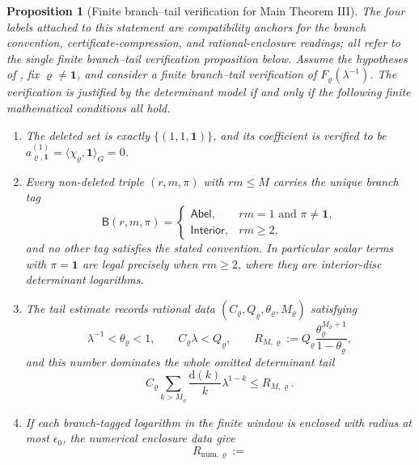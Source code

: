 \documentclass[11pt,a4paper]{amsart}
\theoremstyle{plain}
\newtheorem{proposition}[theorem]{Proposition}
\theoremstyle{definition}
\theoremstyle{remark}
\begin{document}
\begin{proposition}[Finite branch--tail verification for Main Theorem III]
  \label{prop:fixed-label-branch-tail-record}
  \label{cor:main-iii-boundary-determinant-convention}
  \label{thm:fixed-label-certificate-compression}
  \label{cor:fixed-label-product-rational-enclosures}
  The four labels attached to this statement are compatibility anchors for the
  branch convention, certificate-compression, and rational-enclosure readings;
  all refer to the single finite branch--tail verification proposition below.
  Assume the hypotheses of , fix
  \(\varrho\ne\mathbf1\), and consider a finite branch--tail verification of
  \(F_\varrho(\lambda^{-1})\).  The verification is justified by the determinant
  model if and only if the following finite mathematical conditions all hold.
  \begin{enumerate}[label=\textup{(\roman*)},leftmargin=*]
    \item The deleted set is exactly \(\{(1,1,\mathbf1)\}\), and its coefficient
      is verified to be
      \(a_{\varrho,\mathbf1}^{(1)}=\langle\chi_\varrho,\mathbf1\rangle_G=0\).
    \item Every non-deleted triple \((r,m,\pi)\) with \(rm\le M\) carries the
      unique branch tag
      \[
        \mathsf B(r,m,\pi)=
        \begin{cases}
          \mathsf{Abel},& rm=1\text{ and }\pi\ne\mathbf1,\\
          \mathsf{Interior},& rm\ge2,
        \end{cases}
      \]
      and no other tag satisfies the stated convention.  In particular scalar terms with
      \(\pi=\mathbf1\) are legal precisely when \(rm\ge2\), where they are
      interior-disc determinant logarithms.
    \item The tail estimate records rational data
      \((C_\varrho,Q_\varrho,\theta_\varrho,M_\varrho)\) satisfying
      \[
        \lambda^{-1}<\theta_\varrho<1,
        \qquad C_\varrho\lambda<Q_\varrho,
        \qquad
        R_{M,\varrho}:=
        Q_\varrho\frac{\theta_\varrho^{M_\varrho+1}}{1-\theta_\varrho},
      \]
      and this number dominates the whole omitted determinant tail
      \[
        C_\varrho
        \sum_{k>M_\varrho}\frac{\mathrm d(k)}{k}\lambda^{1-k}
        \le R_{M,\varrho}.
      \]
    \item If each branch-tagged logarithm in the finite window is enclosed
      with radius at most \(\epsilon_0\), the numerical enclosure data give
      \[
        R_{\mathrm{num},\varrho}:=
\]
\end{enumerate}
\end{proposition}
\end{document}
